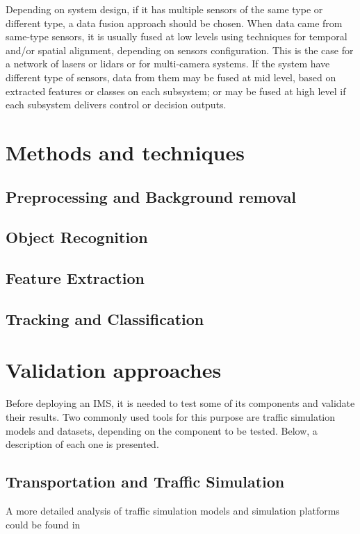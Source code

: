 Depending on system design, if it has multiple sensors of the same type or different type, a data fusion approach should be chosen. When data came from same-type sensors, it is usually fused at low levels using techniques for temporal and/or spatial alignment, depending on sensors configuration. This is the case for a network of lasers or lidars or for multi-camera systems. If the system have different type of sensors, data from them may be fused at mid level, based on  extracted features or classes on each subsystem; or may be fused at high level if each subsystem delivers control or decision outputs.

\section{Methods and techniques}

\subsection{Preprocessing and Background removal}
\subsection{Object Recognition}
\subsection{Feature Extraction}
\subsection{Tracking and Classification}

\section{Validation approaches}

Before deploying an IMS, it is needed to test some of its components and validate their results. Two commonly used tools for this purpose are traffic simulation models and datasets, depending on the component to be tested. Below, a description of each one is presented.

\subsection{Transportation and Traffic Simulation}

A more detailed analysis of traffic simulation models and simulation platforms could be found in \cite{AdamsBoxill2000, Barcelo2000, Kitamura2005, Lieberman1992}
